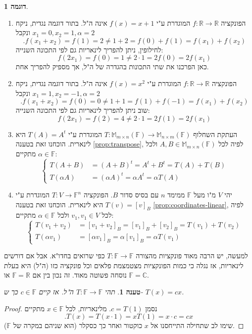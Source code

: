 \documentclass[12pt]{report}
\theoremstyle{plain}
\newtheorem{proposition}[theorem]{טענה}
\theoremstyle{definition}
\newtheorem{example}{דוגמה}[chapter]
\newcommand{\R}{\mathbb{R}}
\newcommand{\C}{\mathbb{C}}
\newcommand{\F}{\mathbb{F}}
\newcommand{\M}{\mathbb{M}}
\newcommand{\0}{\mathbf{0}}
\begin{document}
\begin{example}
\begin{enumerate}[label=\alph*.]
\item 
הפונקציה
$f:\R\to\R$
המוגדרת ע"י
$f(x)=x+1$
אינה ה"ל. בתור דוגמה נגדית, ניקח
$x_1=0,x_2=1,\alpha=2$
ונקבל
$$
.f(x_1+x_2)=f(1)=2\neq 1+2=f(0)+f(1)=f(x_1)+f(x_2)
$$
לחילופין, ניתן להפריך לינאריות גם לפי התכונה השנייה:
$$
f(2x_1)=f(0)=1\neq 2\cdot 1=2f(0)=2f(x_1)
$$
כאן הפרכנו את שתי התכונות בהגדרה של ה"ל, אך מספיק להפריך אחת.


\item 
הפונקציה
$f:\R\to\R$
המוגדרת ע"י
$f(x)=x^2$
אינה ה"ל. בתור דוגמה נגדית, ניקח
$x_1=1,x_2=-1,\alpha=2$
ונקבל
$$
.f(x_1+x_2)=f(0)=0\neq 1+1=f(1)+f(-1)=f(x_1)+f(x_2)
$$
שוב ניתן להפריך לינאריות גם לפי התכונה השנייה:
$$
f(2x_1)=f(2)=4\neq 2\cdot 1=2f(1)=2f(x_1)
$$


\item 
העתקת השחלוף
$T:\M_{m\times n}(\F)\to\M_{n\times m}(\F)$
המוגדרת ע"י
$T(A)=A^t$
היא לינארית. הוכחנו זאת בטענה
\ref{prop:transpose},
לפיה לכל 
$A,B\in\M_{m\times n}(\F)$
ולכל 
$\alpha\in\F$
מתקיים:
$$
\left\{
\begin{aligned}
T(A+B)&=(A+B)^t=A^t+B^t=T(A)+T(B) \\
T(\alpha A)&=(\alpha A)^t=\alpha A^t=\alpha T(A)
\end{aligned}
\right.
$$


\item 
יהי 
$V$
מ"ו מעל
$\F$
ממימד
$n$
עם בסיס סדור
$B$.
הפונקציה
$T:V\to\F^n$
המוגדרת ע"י
$T(v)=[v]_B$
היא לינארית. הוכחנו זאת בטענה
\ref{prop:coordinates-linear},
לפיה לכל
$v_1,v_1\in V$
ולכל
$\alpha\in\F$
מתקיים:
$$
\left\{
\begin{aligned}
T(v_1+v_2)&=[v_1+v_2]_B=[v_1]_B+[v_2]_B=T(v_1)+T(v_2) \\
T(\alpha v_1)&=[\alpha v_1]_B=\alpha[v_1]_B=\alpha T(v_1)
\end{aligned}
\right.
$$


\end{enumerate}
\end{example}

למעשה, יש הרבה מאוד פונקציות מהצורה
$T:\F\to\F$
כפי שרואים בחדו"א. אבל אם דורשים לינאריות, אז נגלה כי כמות הפונקציות מצטמצמת פלאים וכל פונקציה כזו (ה"ל) היא בעלת נוסחה פשוטה מאוד. זה נכון בין אם
$\F=\R$
או 
$\F=\C$.

\begin{proposition}
תהי
$T:\F\to\F$
ה"ל. אז קיים
$c\in\F$
כך ש-
$T(x)=cx$.
\end{proposition}

\begin{proof}
נסמן
$c=T(1)$.
מלינאריות, לכל
$x\in\F$
מתקיים
$$
.T(x)=T(x\cdot 1)=xT(1)=x\cdot c=cx
$$
שימו לב שתחילה התייחסנו אל 
$x$
כוקטור ואחר כך כסקלר (הוא שניהם במקרה של 
$\F$).
\end{proof}
\end{document}
